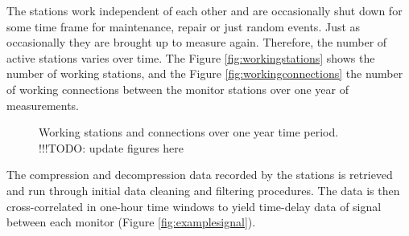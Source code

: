 \documentclass[12pt,a4paper,english]{article}
\newcommand\todo[1]{{\color{red}!!!TODO: #1}}
\begin{document}
The stations work independent of each other and are occasionally shut down for some time frame for maintenance, repair or just random events. Just as occasionally they are brought up to measure again. Therefore, the number of active stations varies over time. The Figure \ref{fig:workingstations} shows the number of working stations, and the Figure \ref{fig:workingconnections} the number of working connections between the monitor stations over one year of measurements. 

\begin{figure}[ht] 
  \centering 
{}
\caption{Working stations and connections over one year time period. \todo{update figures here}}
\label{fig:workingmonitors}
\end{figure}

The compression and decompression data recorded by the stations is retrieved and run through initial data cleaning and filtering procedures. The data is then cross-correlated in one-hour time windows to yield time-delay data of signal between each monitor (Figure \ref{fig:examplesignal}). 
\end{document}
